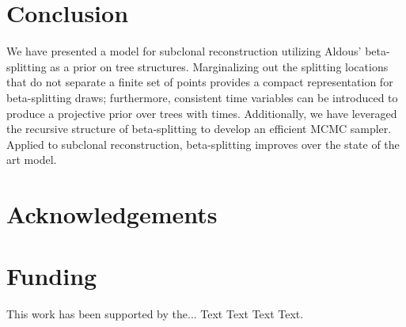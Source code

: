 \documentclass{bioinfo}
\newcommand{\nut}{\tilde{\nu}}
\begin{document}
%


\section{Conclusion}
\label{sec:conclusions}
We have presented a model for subclonal reconstruction utilizing Aldous' beta-splitting as a prior on tree structures.  Marginalizing out the splitting locations that do not separate a finite set of points provides a compact representation for beta-splitting draws; furthermore, consistent time variables can be introduced to produce a projective prior over trees with times.  Additionally, we have leveraged the recursive structure of beta-splitting to develop an efficient MCMC sampler.  Applied to subclonal reconstruction, beta-splitting improves over the state of the art model.


\section*{Acknowledgements}

\section*{Funding}

This work has been supported by the... Text Text  Text Text.\vspace*{-12pt}

%
%
%
%
%
%
%
%
%

\newpage


%
\end{document}
